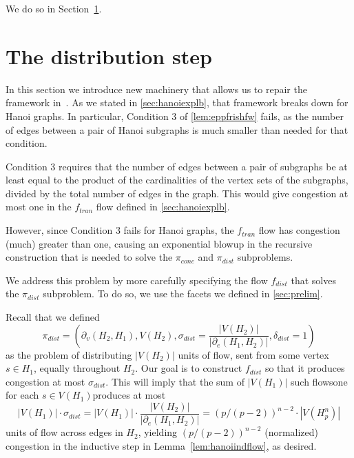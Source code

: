 \documentclass[
final
]{dmtcs-episciences}
\newcommand{\edgeh}[2]{\partial_e(#1,#2)}
\newcommand{\bdryh}[2]{\partial_v(#1,#2)}
\begin{document}
We do so in Section~\ref{sec:handetails}.

\section{The distribution step}
\label{sec:handetails}
In this section we introduce new machinery that allows us to repair the framework in~\cite{eppfrishtri}. As we stated in \cref{sec:hanoiexplb}, that framework breaks down for Hanoi graphs. In particular, Condition 3 of \cref{lem:eppfrishfw} fails, as the number of edges between a pair of Hanoi subgraphs is much smaller than needed for that condition.

Condition 3 requires that the number of edges between a pair of subgraphs be at least equal to the product of the cardinalities of the vertex sets of the subgraphs, divided by the total number of edges in the graph. This would give congestion at most one in the $f_{tran}$ flow defined in \cref{sec:hanoiexplb}.

However, since Condition 3 fails for Hanoi graphs, the $f_{tran}$ flow has congestion (much) greater than one, causing an exponential blowup in the recursive construction that is needed to solve the $\pi_{conc}$ and $\pi_{dist}$ subproblems.

We address this problem by more carefully specifying the flow $f_{dist}$ that solves the $\pi_{dist}$ subproblem. To do so, we use the facets we defined in \cref{sec:prelim}.

Recall that we defined 
\[\pi_{dist} = \left(\bdryh{H_2}{H_1}, V(H_2), \sigma_{dist} = \frac{|V(H_2)|}{|\edgeh{H_1}{H_2}|}, \delta_{dist} = 1\right)\]
as the problem of distributing $|V(H_2)|$ units of flow, sent from some vertex $s \in H_1$, equally throughout $H_2$. 
Our goal is to construct $f_{dist}$ so that it produces congestion at most $\sigma_{dist}$. This will imply that the sum of $|V(H_1)|$ such flows\textemdash one for each $s \in V(H_1)$\textemdash produces at most 
\[|V(H_1)|\cdot\sigma_{dist} = |V(H_1)| \cdot \frac{|V(H_2)|}{|\edgeh{H_1}{H_2}|} = (p/(p-2))^{n-2} \cdot |V(H_p^n)|\] units of flow across edges in $H_2$, yielding $(p/(p-2))^{n-2}$ (normalized) congestion in the inductive step in Lemma~\ref{lem:hanoiindflow}, as desired.
\end{document}
